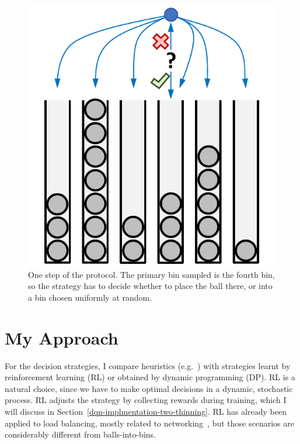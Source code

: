 \begin{figure}
    \centering
    \includegraphics{Chapter1/Figs/two_thinning_intro.pdf}
    \caption{One step of the \TwoThinning protocol. The primary bin sampled is the fourth bin, so the strategy has to decide whether to place the ball there, or into a bin chosen uniformly at random. \protect\footnotemark}
    \label{two-thinning-intro}
\end{figure}


\section{My Approach} \label{my-approach}
For the decision strategies, I compare heuristics (e.g.\ \MeanThinning) with strategies learnt by reinforcement learning (RL) or obtained by dynamic programming (DP). RL is a natural choice, since we have to make optimal decisions in a dynamic, stochastic process. RL adjusts the strategy by collecting rewards during training, which I will discuss in Section~\ref{dqn-implmentation-two-thinning}. RL has already been applied to load balancing, mostly related to networking~\cite{attiah2020RLcellular, yeo2021controller}, but those scenarios are considerably different from balls-into-bins.


